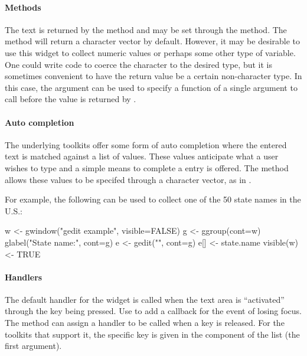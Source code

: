 \paragraph{Methods}
The text is returned by the  method and may be
set through the  method.  The
 method will return a character vector by
default. However, it may be desirable to use this widget to collect
numeric values or perhaps some other type of variable. One could write
code to coerce the character to the desired type, but it is sometimes
convenient to have the return value be a certain non-character
type. In this case, the  argument can be
used to specify a function of a single argument to call before the
value is returned by .

\paragraph{Auto completion}
The underlying toolkits offer some form of auto completion where the
entered text is matched against a list of values. These values
anticipate what a user wishes to type and a simple means to complete a
entry is offered. The \method{[\ASSIGN}{gedit} method allows these
values to be specifed through a character vector, as in .

For example, the following can be used to collect one of the 50 state
names in the U.S.:
\begin{Schunk}
\begin{Sinput}
 w <- gwindow("gedit example", visible=FALSE) 
 g <- ggroup(cont=w)
 glabel("State name:", cont=g)
 e <- gedit("", cont=g)
 e[] <- state.name
 visible(w) <- TRUE
\end{Sinput}
\end{Schunk}

\paragraph{Handlers}
The default handler for the  widget is called when
the text area is ``activated'' through the
 key being pressed. Use  to add a
callback for the event of losing focus. The
 method can assign a handler to be
called when a key is released. For the toolkits that support it, the
specific key is given in the  component of the list  (the first argument).

